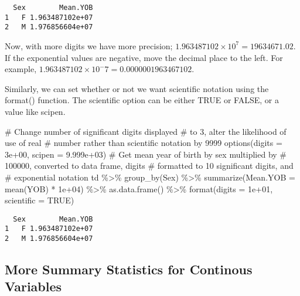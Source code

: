 \documentclass[
  12pt,
  letterpaper]{article}
\newenvironment{Shaded}{\begin{snugshade}}{\end{snugshade}}
\newcommand{\AttributeTok}[1]{\textcolor[rgb]{0.40,0.45,0.13}{#1}}
\newcommand{\CommentTok}[1]{\textcolor[rgb]{0.37,0.37,0.37}{#1}}
\newcommand{\ConstantTok}[1]{\textcolor[rgb]{0.56,0.35,0.01}{#1}}
\newcommand{\FloatTok}[1]{\textcolor[rgb]{0.68,0.00,0.00}{#1}}
\newcommand{\FunctionTok}[1]{\textcolor[rgb]{0.28,0.35,0.67}{#1}}
\newcommand{\NormalTok}[1]{\textcolor[rgb]{0.00,0.23,0.31}{#1}}
\newcommand{\SpecialCharTok}[1]{\textcolor[rgb]{0.37,0.37,0.37}{#1}}
\renewcommand\texttt[1]{{\ttfamily\color{BrickRed}#1}}
\begin{document}
\begin{verbatim}
  Sex        Mean.YOB
1   F 1.963487102e+07
2   M 1.976856604e+07
\end{verbatim}

Now, with more \texttt{digits} we have more precision;
\(1.963487102 \times 10^7 = 19634671.02\). If the exponential values are
negative, move the decimal place to the left. For example,
\(1.963487102 \times 10^-7 = 0.0000001963467102\).

Similarly, we can set whether or not we want scientific notation using
the \texttt{format()} function. The \texttt{scientific} option can be
either \texttt{TRUE} or \texttt{FALSE}, or a value like \texttt{scipen}.

\begin{Shaded}
\begin{Highlighting}[]
\CommentTok{\# Change number of significant digits displayed}
\CommentTok{\# to 3, alter the likelihood of use of real}
\CommentTok{\# number rather than scientific notation by 9999}
\FunctionTok{options}\NormalTok{(}\AttributeTok{digits =} \FloatTok{3e+00}\NormalTok{, }\AttributeTok{scipen =} \FloatTok{9.999e+03}\NormalTok{)}
\CommentTok{\# Get mean year of birth by sex multiplied by}
\CommentTok{\# 100000, converted to data frame, digits}
\CommentTok{\# formatted to 10 significant digits, and}
\CommentTok{\# exponential notation}
\NormalTok{td }\SpecialCharTok{\%\textgreater{}\%}
    \FunctionTok{group\_by}\NormalTok{(Sex) }\SpecialCharTok{\%\textgreater{}\%}
    \FunctionTok{summarize}\NormalTok{(}\AttributeTok{Mean.YOB =} \FunctionTok{mean}\NormalTok{(YOB) }\SpecialCharTok{*} \FloatTok{1e+04}\NormalTok{) }\SpecialCharTok{\%\textgreater{}\%}
    \FunctionTok{as.data.frame}\NormalTok{() }\SpecialCharTok{\%\textgreater{}\%}
    \FunctionTok{format}\NormalTok{(}\AttributeTok{digits =} \FloatTok{1e+01}\NormalTok{, }\AttributeTok{scientific =} \ConstantTok{TRUE}\NormalTok{)}
\end{Highlighting}
\end{Shaded}

\begin{verbatim}
  Sex        Mean.YOB
1   F 1.963487102e+07
2   M 1.976856604e+07
\end{verbatim}

\hypertarget{more-summary-statistics-for-continous-variables}{%
\subsection{More Summary Statistics for Continous
Variables}\label{more-summary-statistics-for-continous-variables}}
\end{document}
